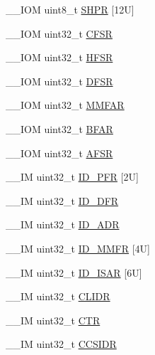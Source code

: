 \begin{DoxyCompactItemize}
\item 
\+\_\+\+\_\+\+I\+OM uint8\+\_\+t \mbox{\hyperlink{struct_s_c_b___type_afdab23abd301033bb318c7b188b377db}{S\+H\+PR}} \mbox{[}12\+U\mbox{]}
\item 
\+\_\+\+\_\+\+I\+OM uint32\+\_\+t \mbox{\hyperlink{struct_s_c_b___type_a0cda9e061b42373383418663092ad19a}{C\+F\+SR}}
\item 
\+\_\+\+\_\+\+I\+OM uint32\+\_\+t \mbox{\hyperlink{struct_s_c_b___type_a14ad254659362b9752c69afe3fd80934}{H\+F\+SR}}
\item 
\+\_\+\+\_\+\+I\+OM uint32\+\_\+t \mbox{\hyperlink{struct_s_c_b___type_a191579bde0d21ff51d30a714fd887033}{D\+F\+SR}}
\item 
\+\_\+\+\_\+\+I\+OM uint32\+\_\+t \mbox{\hyperlink{struct_s_c_b___type_a2d03d0b7cec2254f39eb1c46c7445e80}{M\+M\+F\+AR}}
\item 
\+\_\+\+\_\+\+I\+OM uint32\+\_\+t \mbox{\hyperlink{struct_s_c_b___type_a3f8e7e58be4e41c88dfa78f54589271c}{B\+F\+AR}}
\item 
\+\_\+\+\_\+\+I\+OM uint32\+\_\+t \mbox{\hyperlink{struct_s_c_b___type_ab65372404ce64b0f0b35e2709429404e}{A\+F\+SR}}
\item 
\+\_\+\+\_\+\+IM uint32\+\_\+t \mbox{\hyperlink{struct_s_c_b___type_a7a23d21186bc6aa71855a68666202984}{I\+D\+\_\+\+P\+FR}} \mbox{[}2\+U\mbox{]}
\item 
\+\_\+\+\_\+\+IM uint32\+\_\+t \mbox{\hyperlink{struct_s_c_b___type_ada1d3119c020983fdc949c2ccd406caa}{I\+D\+\_\+\+D\+FR}}
\item 
\+\_\+\+\_\+\+IM uint32\+\_\+t \mbox{\hyperlink{struct_s_c_b___type_aa5c5a6ccc7042927ce3feadc41872aa4}{I\+D\+\_\+\+A\+DR}}
\item 
\+\_\+\+\_\+\+IM uint32\+\_\+t \mbox{\hyperlink{struct_s_c_b___type_ad3ce108b65d07e91c4a1054d50e4bd8a}{I\+D\+\_\+\+M\+M\+FR}} \mbox{[}4\+U\mbox{]}
\item 
\+\_\+\+\_\+\+IM uint32\+\_\+t \mbox{\hyperlink{struct_s_c_b___type_a5be03d185d9bde32c5b9028f792f8e1e}{I\+D\+\_\+\+I\+S\+AR}} \mbox{[}6\+U\mbox{]}
\item 
\+\_\+\+\_\+\+IM uint32\+\_\+t \mbox{\hyperlink{struct_s_c_b___type_ad9899f5775251cf5ef0cb0845527afc2}{C\+L\+I\+DR}}
\item 
\+\_\+\+\_\+\+IM uint32\+\_\+t \mbox{\hyperlink{struct_s_c_b___type_af3fe705fef8762763b6d61dbdf0ccc3d}{C\+TR}}
\item 
\+\_\+\+\_\+\+IM uint32\+\_\+t \mbox{\hyperlink{struct_s_c_b___type_afd063c9297a1a3b67e6d1d5e179e6a0e}{C\+C\+S\+I\+DR}}
\item 

\end{DoxyCompactItemize}
